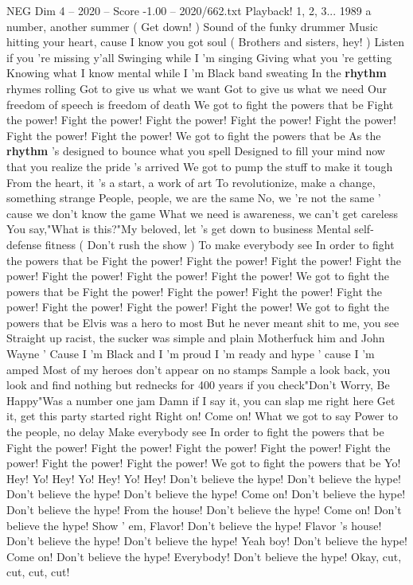 \begin{textsample}{NEG Dim 4 – 2020 – Score -1.00 – 2020/662.txt}  \label{ex:f4_neg_022}
Playback! 1, 2, 3... 1989 a number, another summer ( Get down! ) Sound of the funky drummer Music hitting your heart, cause I know you got soul ( Brothers and sisters, hey! ) Listen if you 're missing y'all Swinging while I 'm singing Giving what you 're getting Knowing what I know mental while I 'm Black band sweating In the \textbf{rhythm} rhymes rolling Got to give us what we want Got to give us what we need Our freedom of speech is freedom of death We got to fight the powers that be Fight the power!
Fight the power!
Fight the power!
Fight the power!
Fight the power!
Fight the power!
Fight the power!
We got to fight the powers that be As the \textbf{rhythm} 's designed to bounce what you spell Designed to fill your mind now that you realize the pride 's arrived We got to pump the stuff to make it tough From the heart, it 's a start, a work of art To revolutionize, make a change, something strange People, people, we are the same No, we 're not the same ' cause we don't know the game What we need is awareness, we can't get careless You say,"What is this?"My beloved, let 's get down to business Mental self-defense fitness ( Don't rush the show ) To make everybody see In order to fight the powers that be Fight the power!
Fight the power!
Fight the power!
Fight the power!
Fight the power!
Fight the power!
Fight the power!
We got to fight the powers that be Fight the power!
Fight the power!
Fight the power!
Fight the power!
Fight the power!
Fight the power!
Fight the power!
We got to fight the powers that be Elvis was a hero to most But he never meant shit to me, you see Straight up racist, the sucker was simple and plain Motherfuck him and John Wayne ' Cause I 'm Black and I 'm proud I 'm ready and hype ' cause I 'm amped Most of my heroes don't appear on no stamps Sample a look back, you look and find nothing but rednecks for 400 years if you check"Don't Worry, Be Happy"Was a number one jam Damn if I say it, you can slap me right here Get it, get this party started right Right on!
Come on!
What we got to say Power to the people, no delay Make everybody see In order to fight the powers that be Fight the power!
Fight the power!
Fight the power!
Fight the power!
Fight the power!
Fight the power!
Fight the power!
We got to fight the powers that be Yo!
Hey!
Yo!
Hey!
Yo!
Hey!
Yo!
Hey!
Don't believe the hype!
Don't believe the hype!
Don't believe the hype!
Don't believe the hype!
Come on!
Don't believe the hype!
Don't believe the hype!
From the house!
Don't believe the hype!
Come on!
Don't believe the hype!
Show ' em, Flavor!
Don't believe the hype!
Flavor 's house!
Don't believe the hype!
Don't believe the hype!
Yeah boy!
Don't believe the hype!
Come on!
Don't believe the hype!
Everybody!
Don't believe the hype!
Okay, cut, cut, cut, cut!

\end{textsample}
